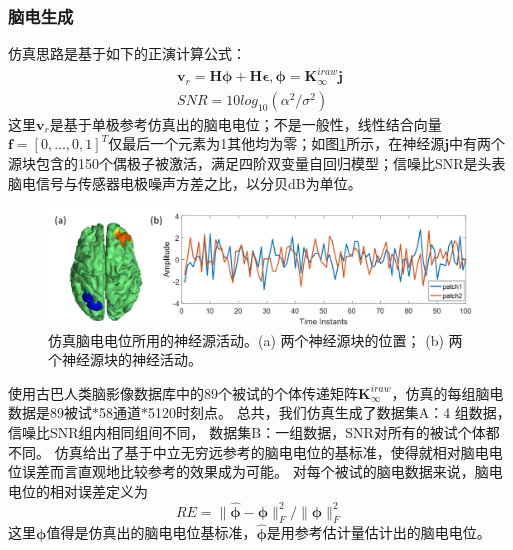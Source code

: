 \subsubsection{脑电生成}
仿真思路是基于如下的正演计算公式：
\begin{equation}\label{eq3.18}
\begin{split}
\mathbf{v}_r=\mathbf{H\phi}+\mathbf{H\epsilon},\mathbf{\phi}=\mathbf{K}_{\infty}^{iraw}\mathbf{j}\\
SNR=10log_{10}(\alpha^2/\sigma^2)
\end{split}
\end{equation}
这里$\mathbf{v}_r$是基于单极参考仿真出的脑电电位；不是一般性，线性结合向量$\mathbf{f}=[0,...,0,1]^T$仅最后一个元素为1其他均为零；如图\ref{3.3}所示，在神经源$\mathbf{j}$中有两个源块包含的150个偶极子被激活，满足四阶双变量自回归模型；信噪比SNR是头表脑电信号与传感器电极噪声方差之比，以分贝dB为单位。
\begin{figure}[!ht]
	\centering
	\includegraphics[width=15cm]{pic/Frontier/figure3.png}
	\caption{仿真脑电电位所用的神经源活动。(a) 两个神经源块的位置； (b) 两个神经源块的神经活动。}
	\label{3.3}
\end{figure}
使用古巴人类脑影像数据库中的89个被试的个体传递矩阵$\mathbf{K}_{\infty}^{iraw}$，仿真的每组脑电数据是89被试$\ast$58通道$\ast$5120时刻点。 总共，我们仿真生成了数据集A：4 组数据，信噪比SNR组内相同组间不同， 数据集B：一组数据，SNR对所有的被试个体都不同。 仿真给出了基于中立无穷远参考的脑电电位的基标准，使得就相对脑电电位误差而言直观地比较参考的效果成为可能。 对每个被试的脑电数据来说，脑电电位的相对误差定义为
\begin{equation}\label{eq3.19}
RE=\lVert\hat{\mathbf{\phi}}-\mathbf{\phi}\rVert^2_F/{\lVert\mathbf{\phi}\rVert^2_F}
\end{equation}
这里$\mathbf{\phi}$值得是仿真出的脑电电位基标准，$\hat{\mathbf{\phi}}$是用参考估计量估计出的脑电电位。

